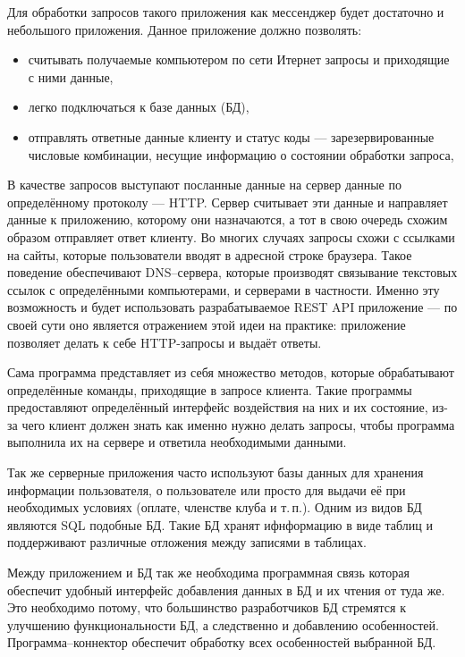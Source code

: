 \documentclass[14pt,final]{report}
\begin{document}
Для обработки запросов такого приложения как мессенджер будет достаточно и небольшого приложения. Данное приложение должно позволять: 
\begin{itemize}
    \item считывать получаемые компьютером по сети Итернет запросы и приходящие с ними данные,
    \item легко подключаться к базе данных (БД),
    \item отправлять ответные данные клиенту и статус коды --- зарезервированные числовые комбинации, несущие информацию о состоянии обработки запроса,
\end{itemize}

В качестве запросов выступают посланные данные на сервер данные по определённому протоколу --- HTTP\cite{polard}. Сервер считывает эти данные и направляет данные к приложению, которому они назначаются, а тот в свою очередь схожим образом отправляет ответ клиенту. Во многих случаях запросы схожи с ссылками на сайты, которые пользователи вводят в адресной строке браузера. Такое поведение обеспечивают DNS--сервера, которые производят связывание текстовых ссылок с определёнными компьютерами, и серверами в частности. Именно эту возможность и будет использовать разрабатываемое REST API приложение --- по своей сути оно является отражением этой идеи на практике: приложение позволяет делать к себе HTTP-запросы и выдаёт ответы.

Сама программа представляет из себя множество методов, которые обрабатывают определённые команды, приходящие в запросе клиента. Такие программы предоставляют определённый интерфейс воздействия на них и их состояние, из-за чего клиент должен знать как именно нужно делать запросы, чтобы программа выполнила их на сервере и ответила необходимыми данными.

Так же серверные приложения часто используют базы данных для хранения информации пользователя, о пользователе или просто для выдачи её при необходимых условиях (оплате, членстве клуба и т.\,п.). Одним из видов БД являются SQL подобные БД. Такие БД хранят ифнформацию в виде таблиц и поддерживают различные отложения между записями в таблицах.

Между приложением и БД так же необходима программная связь которая обеспечит удобный интерфейс добавления данных в БД и их чтения от туда же. Это необходимо потому, что большинство разработчиков БД стремятся к улучшению функциональности БД, а следственно и добавлению особенностей. Программа--коннектор обеспечит обработку всех особенностей выбранной БД.
\end{document}
